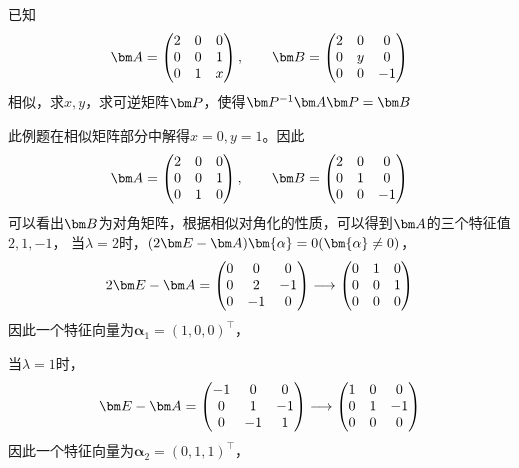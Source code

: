 \begin{example}
    已知
    \[
        \mat{A} =
        \begin{pmatrix}
            2 & 0 & 0 \\
            0 & 0 & 1 \\
            0 & 1 & x
        \end{pmatrix}
        ,\qquad
        \mat{B} =
        \begin{pmatrix}
            2 & 0 & 0  \\
            0 & y & 0  \\
            0 & 0 & -1
        \end{pmatrix}
    \]
    相似，求$x,y$，求可逆矩阵$\mat{P}$，使得$\mat{P}^{-1}\mat{A}\mat{P}=\mat{B}$
\end{example}
\begin{solution}
    此例题在相似矩阵部分中解得$x=0,y=1$。因此
    \[
        \mat{A} =
        \begin{pmatrix}
            2 & 0 & 0 \\
            0 & 0 & 1 \\
            0 & 1 & 0
        \end{pmatrix}
        ,\qquad
        \mat{B} =
        \begin{pmatrix}
            2 & 0 & 0  \\
            0 & 1 & 0  \\
            0 & 0 & -1
        \end{pmatrix}
    \]
    可以看出$\mat{B}$为对角矩阵，根据相似对角化的性质，可以得到$\mat{A}$的三个特征值$2,1,-1$，
    当$\lambda=2$时，$(2\mat{E}-\mat{A})\bm{\alpha}=0(\bm{\alpha}\neq 0)$，
    \[
        2\mat{E}-\mat{A} =
        \begin{pmatrix}
            0 & 0  & 0  \\
            0 & 2  & -1 \\
            0 & -1 & 0  \\
        \end{pmatrix}
        \longrightarrow
        \begin{pmatrix}
            0 & 1 & 0 \\
            0 & 0 & 1 \\
            0 & 0 & 0 \\
        \end{pmatrix}
    \]
    因此一个特征向量为$\bm{\alpha}_1 = (1,0,0)^\intercal$，

    当$\lambda = 1$时，
    \[
        \mat{E}-\mat{A} =
        \begin{pmatrix}
            -1 & 0  & 0  \\
            0  & 1  & -1 \\
            0  & -1 & 1  \\
        \end{pmatrix}
        \longrightarrow
        \begin{pmatrix}
            1 & 0 & 0  \\
            0 & 1 & -1 \\
            0 & 0 & 0  \\
        \end{pmatrix}
    \]
    因此一个特征向量为$\bm{\alpha}_2 = (0,1,1)^\intercal$，


\end{solution}
